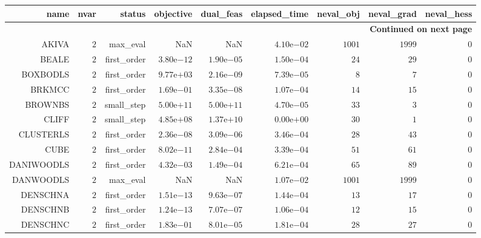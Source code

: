 \begin{longtable}{rrrrrrrrr}
\hline
name & nvar & status & objective & dual\_feas & elapsed\_time & neval\_obj & neval\_grad & neval\_hess \\\hline
\endhead
\hline
\multicolumn{9}{r}{{\bfseries Continued on next page}}\\
\hline
\endfoot
\endlastfoot
AKIVA & \(     2\) & max\_eval &       NaN &       NaN & \( 4.10\)e\(-02\) & \(  1001\) & \(  1999\) & \(     0\) \\
BEALE & \(     2\) & first\_order & \( 3.80\)e\(-12\) & \( 1.90\)e\(-05\) & \( 1.50\)e\(-04\) & \(    24\) & \(    29\) & \(     0\) \\
BOXBODLS & \(     2\) & first\_order & \( 9.77\)e\(+03\) & \( 2.16\)e\(-09\) & \( 7.39\)e\(-05\) & \(     8\) & \(     7\) & \(     0\) \\
BRKMCC & \(     2\) & first\_order & \( 1.69\)e\(-01\) & \( 3.35\)e\(-08\) & \( 1.07\)e\(-04\) & \(    14\) & \(    15\) & \(     0\) \\
BROWNBS & \(     2\) & small\_step & \( 5.00\)e\(+11\) & \( 5.00\)e\(+11\) & \( 4.70\)e\(-05\) & \(    33\) & \(     3\) & \(     0\) \\
CLIFF & \(     2\) & small\_step & \( 4.85\)e\(+08\) & \( 1.37\)e\(+10\) & \( 0.00\)e\(+00\) & \(    30\) & \(     1\) & \(     0\) \\
CLUSTERLS & \(     2\) & first\_order & \( 2.36\)e\(-08\) & \( 3.09\)e\(-06\) & \( 3.46\)e\(-04\) & \(    28\) & \(    43\) & \(     0\) \\
CUBE & \(     2\) & first\_order & \( 8.02\)e\(-11\) & \( 2.84\)e\(-04\) & \( 3.39\)e\(-04\) & \(    51\) & \(    61\) & \(     0\) \\
DANIWOODLS & \(     2\) & first\_order & \( 4.32\)e\(-03\) & \( 1.49\)e\(-04\) & \( 6.21\)e\(-04\) & \(    65\) & \(    89\) & \(     0\) \\
DANWOODLS & \(     2\) & max\_eval &       NaN &       NaN & \( 1.07\)e\(-02\) & \(  1001\) & \(  1999\) & \(     0\) \\
DENSCHNA & \(     2\) & first\_order & \( 1.51\)e\(-13\) & \( 9.63\)e\(-07\) & \( 1.44\)e\(-04\) & \(    13\) & \(    17\) & \(     0\) \\
DENSCHNB & \(     2\) & first\_order & \( 1.24\)e\(-13\) & \( 7.07\)e\(-07\) & \( 1.06\)e\(-04\) & \(    12\) & \(    15\) & \(     0\) \\
DENSCHNC & \(     2\) & first\_order & \( 1.83\)e\(-01\) & \( 8.01\)e\(-05\) & \( 1.81\)e\(-04\) & \(    28\) & \(    27\) & \(     0\) \\

\end{longtable}
